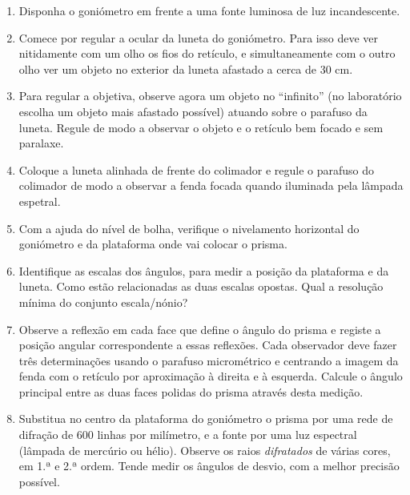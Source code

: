 \documentclass[a4paper,12pt]{article}      %
\begin{document}
\begin{enumerate}
\item Disponha o goniómetro em frente a uma fonte luminosa de luz incandescente.
\item Comece por regular a ocular da luneta do goniómetro. Para isso deve ver nitidamente com um 
olho  os fios do retículo, e simultaneamente com o outro olho ver um objeto no exterior da luneta afastado a cerca de 30 cm.  
\item Para  regular  a  objetiva,  observe  agora  um  objeto  no  “infinito” (no  laboratório 
escolha  um objeto  mais  afastado possível)  atuando  sobre  o  parafuso  da  luneta.  Regule  de  modo  a 
observar o objeto e o retículo bem focado e sem paralaxe. 
\item Coloque  a  luneta  alinhada de frente  do  colimador  e  regule o parafuso  do 
colimador de modo a observar a fenda focada quando iluminada pela lâmpada espetral. 
\item Com a ajuda do nível de bolha, verifique o nivelamento horizontal do goniómetro e da plataforma onde vai colocar o prisma.
\item Identifique as escalas dos ângulos, para medir a posição da plataforma e da luneta. Como estão relacionadas as duas escalas opostas. Qual a resolução mínima do conjunto escala/nónio?
\item Observe a reflexão em cada face que define o ângulo do prisma e registe a posição angular 
correspondente a essas reflexões. Cada observador deve fazer três determinações usando o 
parafuso  micrométrico e centrando  a  imagem  da  fenda  com  o retículo  por  aproximação  à direita e à esquerda. Calcule o ângulo principal entre as duas faces polidas do prisma através desta medição.
\item Substitua no centro da plataforma do goniómetro o prisma por uma rede de difração de 
600 linhas por milímetro, e a fonte por uma luz espectral (lâmpada de mercúrio ou hélio). Observe os raios \emph{difratados} de várias cores, em 1.ª e 2.ª ordem. Tende medir os ângulos de desvio, com a melhor precisão possível.

\end{enumerate}


	
\newpage
\def\width{18}
\def\hauteur{25}
\end{document}
